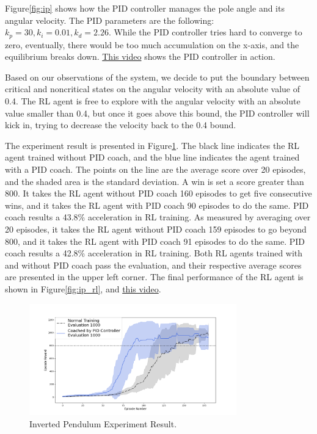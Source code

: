 Figure\ref{fig:ip} shows how the PID controller manages the pole angle and its angular velocity. The PID parameters are the following: $k_p=30,k_i=0.01,k_d=2.26$. While the PID controller tries hard to converge to zero, eventually, there would be too much accumulation on the x-axis, and the equilibrium breaks down. \href{https://www.youtube.com/watch?v=LU0iQzifB_I}{This video} shows the PID controller in action.

Based on our observations of the system, we decide to put the boundary between critical and noncritical states on the angular velocity with an absolute value of 0.4. The RL agent is free to explore with the angular velocity with an absolute value smaller than 0.4, but once it goes above this bound, the PID controller will kick in, trying to decrease the velocity back to the 0.4 bound.

The experiment result is presented in Figure\ref{fig:ip_result}. The black line indicates the RL agent trained without PID coach, and the blue line indicates the agent trained with a PID coach. The points on the line are the average score over 20 episodes, and the shaded area is the standard deviation. A win is set a score greater than 800. It takes the RL agent without PID coach 160 episodes to get five consecutive wins, and it takes the RL agent with PID coach 90 episodes to do the same. PID coach results a 43.8\% acceleration in RL training. As measured by averaging over 20 episodes, it takes the RL agent without PID coach 159 episodes to go beyond 800, and it takes the RL agent with PID coach 91 episodes to do the same. PID coach results a 42.8\% acceleration in RL training. Both RL agents trained with and without PID coach pass the evaluation, and their respective average scores are presented in the upper left corner. The final performance of the RL agent is shown in Figure\ref{fig:ip_rl}, and \href{https://www.youtube.com/watch?v=2vHOizehqu8}{this video}.
\begin{figure}[H]
     \centering
      \includegraphics[width=0.8\textwidth]{ip.png}
      \caption{Inverted Pendulum Experiment Result. }
      \label{fig:ip_result}

\end{figure}


